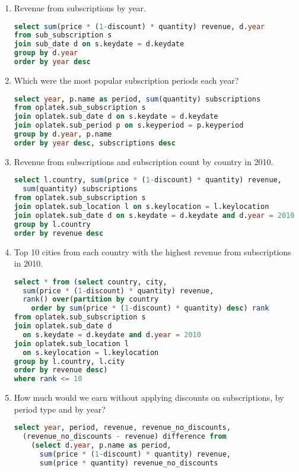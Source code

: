 \begin{enumerate}
  \item Revenue from subscriptions by year.
\begin{lstlisting}[language=sql]
select sum(price * (1-discount) * quantity) revenue, d.year 
from sub_subscription s 
join sub_date d on s.keydate = d.keydate 
group by d.year 
order by year desc
\end{lstlisting}
  \item Which were the most popular subscription periods each year?
\begin{lstlisting}[language=sql]
select year, p.name as period, sum(quantity) subscriptions
from oplatek.sub_subscription s 
join oplatek.sub_date d on s.keydate = d.keydate
join oplatek.sub_period p on s.keyperiod = p.keyperiod 
group by d.year, p.name
order by year desc, subscriptions desc
\end{lstlisting}
  \item Revenue from subscriptions and subscription count by country in 2010.
\begin{lstlisting}[language=sql]
select l.country, sum(price * (1-discount) * quantity) revenue, 
  sum(quantity) subscriptions 
from oplatek.sub_subscription s 
join oplatek.sub_location l on s.keylocation = l.keylocation 
join oplatek.sub_date d on s.keydate = d.keydate and d.year = 2010
group by l.country 
order by revenue desc
\end{lstlisting}
  \item Top 10 cities from each country with the highest revenue from subscriptions in 2010.
\begin{lstlisting}[language=sql]  
select * from (select country, city, 
  sum(price * (1-discount) * quantity) revenue, 
  rank() over(partition by country 
    order by sum(price * (1-discount) * quantity) desc) rank 
from oplatek.sub_subscription s 
join oplatek.sub_date d 
  on s.keydate = d.keydate and d.year = 2010
join oplatek.sub_location l 
  on s.keylocation = l.keylocation
group by l.country, l.city
order by revenue desc)
where rank <= 10
\end{lstlisting}
  \item How much would we earn without applying discounts on subscriptions, by period type and by year?
\begin{lstlisting}[language=sql] 
select year, period, revenue, revenue_no_discounts, 
  (revenue_no_discounts - revenue) difference from 
    (select d.year, p.name as period, 
      sum(price * (1-discount) * quantity) revenue, 
      sum(price * quantity) revenue_no_discounts

\end{lstlisting}
\end{enumerate}
